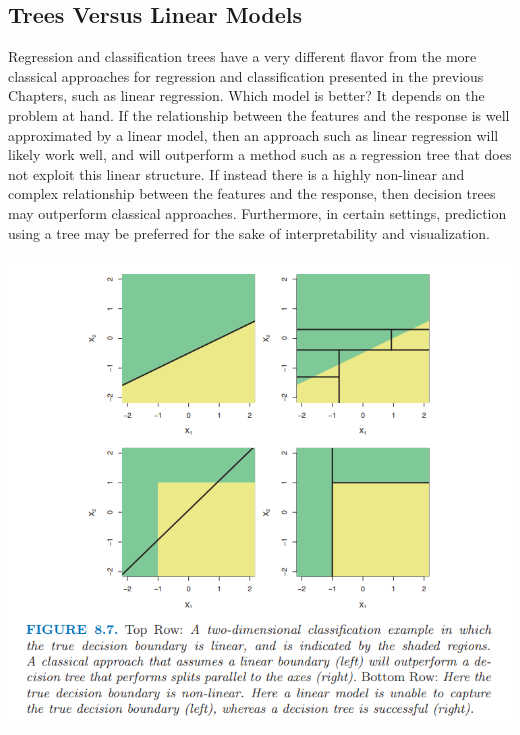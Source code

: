 \subsection{Trees Versus Linear Models}
Regression and classification trees have a very different flavor from the more
classical approaches for regression and classification presented in the previous Chapters, such as linear regression. Which model is better? It depends on the problem at hand. If the relationship between the features and the response is well approximated by a linear model, then an approach such as linear regression
will likely work well, and will outperform a method such as a regression tree that does not exploit this linear structure. If instead there is a highly
non-linear and complex relationship between the features and the response, then decision trees may outperform classical approaches. Furthermore, in certain settings, prediction using a tree may be preferred for the sake of interpretability and visualization.
\begin{center}
    \includegraphics[scale=.7]{images/lin-reg-vs-reg-tree.png}
\end{center}


